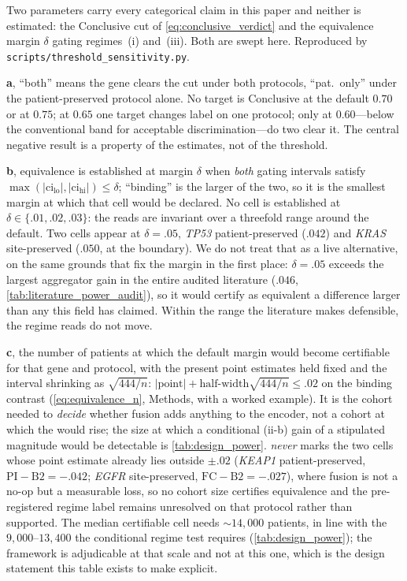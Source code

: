 \begin{flushleft}\footnotesize
Two parameters carry every categorical claim in this paper and neither is
estimated: the Conclusive cut of \cref{eq:conclusive_verdict} and the
equivalence margin $\delta$ gating regimes~(i) and~(iii). Both are swept here.
Reproduced by \texttt{scripts/threshold\_sensitivity.py}.
\par\medskip
\textbf{a}, ``both'' means the gene clears the cut under both protocols,
``pat.\ only'' under the patient-preserved protocol alone. No target is
Conclusive at the default $0.70$ or at $0.75$; at $0.65$ one target changes
label on one protocol; only at $0.60$---below the conventional band for
acceptable discrimination\cite{hosmer2000applied}---do two clear it. The
central negative result is a property of the estimates, not of the threshold.
\par\medskip
\textbf{b}, equivalence is established at margin $\delta$ when \emph{both}
gating intervals satisfy $\max(|\mathrm{ci}_{\mathrm{lo}}|,
|\mathrm{ci}_{\mathrm{hi}}|)\!\leq\!\delta$; ``binding'' is the larger of the
two, so it is the smallest margin at which that cell would be declared. No
cell is established at $\delta\!\in\!\{.01,.02,.03\}$: the reads are invariant
over a threefold range around the default. Two cells appear at $\delta=.05$,
\textit{TP53} patient-preserved ($.042$) and \textit{KRAS} site-preserved
($.050$, at the boundary). We do not treat that as a live alternative, on the
same grounds that fix the margin in the first place: $\delta=.05$ exceeds the
largest aggregator gain in the entire audited
literature ($.046$, \cref{tab:literature_power_audit}), so it would certify as
equivalent a difference larger than any this field has claimed. Within the
range the literature makes defensible, the regime reads do not move.
\par\medskip
\textbf{c}, the number of patients at which the default margin would become
certifiable for that gene and protocol, with the present point estimates
held fixed and the interval shrinking as $\sqrt{444/n}$:
$|\text{point}| + \text{half-width}\sqrt{444/n} \leq .02$ on the binding
contrast (\cref{eq:equivalence_n}, Methods, with a worked example). It is the cohort needed to \emph{decide} whether fusion adds
anything to the encoder, not a cohort at which the \auroc{} would rise;
the size at which a conditional (ii-b) gain of a stipulated magnitude would
be detectable is \cref{tab:design_power}. \emph{never} marks the two cells whose point estimate already lies
outside $\pm.02$ (\textit{KEAP1} patient-preserved, $\mathrm{PI}-\mathrm{B2}
=-.042$; \textit{EGFR} site-preserved, $\mathrm{FC}-\mathrm{B2}=-.027$), where
fusion is not a no-op but a measurable loss, so no cohort size certifies
equivalence and the pre-registered regime label remains unresolved on that
protocol rather than supported. The median certifiable cell needs
$\sim\!14{,}000$ patients, in line with the $9{,}000$--$13{,}400$ the
conditional regime test requires (\cref{tab:design_power}); the framework is
adjudicable at that scale and not at this one, which is the design statement
this table exists to make explicit.
\end{flushleft}
